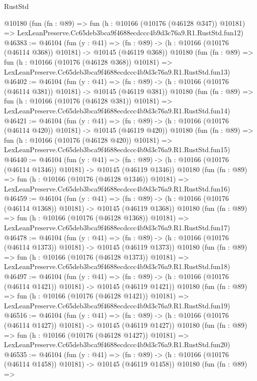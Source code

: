 \begin{lexlean}{RustStd}
\begin{coremodule}
    @10180
    (fun (fn : @89) =>
    fun (h : @10166 (@10176 (@46128 @347)) @10181) =>
    LexLeanPreserve.Cc65deb3bca9f4688ecdccc4b9d3c76a9.R1.RustStd.fun12)
@46383 := @46104
    (fun (y : @41) =>
    (fn : @89) -> (h : @10166 (@10176 (@46114 @368)) @10181) -> @10145 (@46119 @368))
    @10180
    (fun (fn : @89) =>
    fun (h : @10166 (@10176 (@46128 @368)) @10181) =>
    LexLeanPreserve.Cc65deb3bca9f4688ecdccc4b9d3c76a9.R1.RustStd.fun13)
@46402 := @46104
    (fun (y : @41) =>
    (fn : @89) -> (h : @10166 (@10176 (@46114 @381)) @10181) -> @10145 (@46119 @381))
    @10180
    (fun (fn : @89) =>
    fun (h : @10166 (@10176 (@46128 @381)) @10181) =>
    LexLeanPreserve.Cc65deb3bca9f4688ecdccc4b9d3c76a9.R1.RustStd.fun14)
@46421 := @46104
    (fun (y : @41) =>
    (fn : @89) -> (h : @10166 (@10176 (@46114 @420)) @10181) -> @10145 (@46119 @420))
    @10180
    (fun (fn : @89) =>
    fun (h : @10166 (@10176 (@46128 @420)) @10181) =>
    LexLeanPreserve.Cc65deb3bca9f4688ecdccc4b9d3c76a9.R1.RustStd.fun15)
@46440 := @46104
    (fun (y : @41) =>
    (fn : @89) -> (h : @10166 (@10176 (@46114 @1346)) @10181) -> @10145 (@46119 @1346))
    @10180
    (fun (fn : @89) =>
    fun (h : @10166 (@10176 (@46128 @1346)) @10181) =>
    LexLeanPreserve.Cc65deb3bca9f4688ecdccc4b9d3c76a9.R1.RustStd.fun16)
@46459 := @46104
    (fun (y : @41) =>
    (fn : @89) -> (h : @10166 (@10176 (@46114 @1368)) @10181) -> @10145 (@46119 @1368))
    @10180
    (fun (fn : @89) =>
    fun (h : @10166 (@10176 (@46128 @1368)) @10181) =>
    LexLeanPreserve.Cc65deb3bca9f4688ecdccc4b9d3c76a9.R1.RustStd.fun17)
@46478 := @46104
    (fun (y : @41) =>
    (fn : @89) -> (h : @10166 (@10176 (@46114 @1373)) @10181) -> @10145 (@46119 @1373))
    @10180
    (fun (fn : @89) =>
    fun (h : @10166 (@10176 (@46128 @1373)) @10181) =>
    LexLeanPreserve.Cc65deb3bca9f4688ecdccc4b9d3c76a9.R1.RustStd.fun18)
@46497 := @46104
    (fun (y : @41) =>
    (fn : @89) -> (h : @10166 (@10176 (@46114 @1421)) @10181) -> @10145 (@46119 @1421))
    @10180
    (fun (fn : @89) =>
    fun (h : @10166 (@10176 (@46128 @1421)) @10181) =>
    LexLeanPreserve.Cc65deb3bca9f4688ecdccc4b9d3c76a9.R1.RustStd.fun19)
@46516 := @46104
    (fun (y : @41) =>
    (fn : @89) -> (h : @10166 (@10176 (@46114 @1427)) @10181) -> @10145 (@46119 @1427))
    @10180
    (fun (fn : @89) =>
    fun (h : @10166 (@10176 (@46128 @1427)) @10181) =>
    LexLeanPreserve.Cc65deb3bca9f4688ecdccc4b9d3c76a9.R1.RustStd.fun20)
@46535 := @46104
    (fun (y : @41) =>
    (fn : @89) -> (h : @10166 (@10176 (@46114 @1458)) @10181) -> @10145 (@46119 @1458))
    @10180
    (fun (fn : @89) =>

\end{coremodule}
\end{lexlean}
